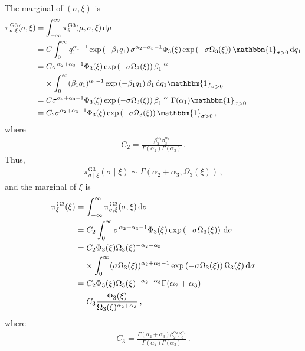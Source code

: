 \documentclass{article}
\newcommand{\dd}{{\rm d}}
\begin{document}
%
The marginal of $(\sigma, \xi)$ is
%
\begin{align}
	\pi ^ {\text{G3}}_{\sigma, \xi}(\sigma, \xi)
		&= \int_{-\infty}^\infty \pi_{\theta}^{\text{G3}}(\mu, \sigma, \xi)
		\, \dd \mu \nonumber\\
	&=C \int_{0}^\infty q_1 ^ {\alpha_1 - 1} \exp\left(-\beta_1 q_1\right)
		\sigma^{\alpha_2 + \alpha_3 - 1} \Phi_3(\xi)
		\exp\left(-\sigma \Omega_3(\xi)\right)\mathbbm{1}_{\sigma > 0}
		\, \dd q_1 \nonumber\\
	&= C \sigma ^ {\alpha_2 + \alpha_3 - 1} \Phi_3(\xi)
		\exp\left(-\sigma \Omega_3(\xi)\right) \beta_1 ^ {-\alpha_1} \nonumber\\
	&\ \phantom{=} \times \int_{0}^\infty (\beta_1 q_1) ^ {\alpha_1 - 1}
		\exp\left(-\beta_1 q_1\right) \beta_1 \, \dd q_1
		\mathbbm{1}_{\sigma > 0} \nonumber\\
	&= C \sigma ^ {\alpha_2 + \alpha_3 - 1} \Phi_3(\xi)
		\exp\left(-\sigma \Omega_3(\xi)\right) \beta_1 ^ {-\alpha_1}
		\Gamma(\alpha_1) \mathbbm{1}_{\sigma > 0} \nonumber\\
	&= C_2 \sigma ^ {\alpha_2 + \alpha_3 - 1} \Phi_3(\xi)
		\exp\left(-\sigma \Omega_3(\xi)\right) \mathbbm{1}_{\sigma > 0} \,,
	\label{eq:prior-1-xi-sigma}
\end{align}
%
where
%
\begin{align*}
	C_2 = \frac{\beta_2 ^ {\alpha_2} \beta_3 ^ {\alpha_3}}
		{\Gamma(\alpha_2) \Gamma(\alpha_3)} \,.
\end{align*}
%
Thus,
%
\begin{align*}
	\pi ^ {\text{G3}}_{\sigma \mid \xi}(\sigma \mid \xi)
		\sim \Gamma(\alpha_2 + \alpha_3, \Omega_3(\xi)) \,,
\end{align*}
%
and the marginal of $\xi$ is
%
\begin{align}
	\pi ^ {\text{G3}}_\xi(\xi)
		&= \int_{-\infty}^\infty \pi^{\text{G3}}_{\sigma, \xi}(\sigma, \xi)
		\, \dd \sigma \nonumber\\
	&=C_2 \int_{0}^\infty \sigma ^ {\alpha_2 + \alpha_3 - 1} \Phi_3(\xi)
		\exp\left(-\sigma \Omega_3(\xi)\right) \, \dd \sigma \nonumber\\
	&=C_2 \Phi_3(\xi) \Omega_3(\xi) ^ {-\alpha_2 - \alpha_3} \nonumber\\
	&\ \phantom{=} \times \int_{0}^\infty (\sigma \Omega_3(\xi))
		^ {\alpha_2 + \alpha_3 - 1} \exp\left(-\sigma \Omega_3(\xi)\right)
		\Omega_3(\xi) \, \dd \sigma \nonumber\\
	&= C_2 \Phi_3(\xi) \Omega_3(\xi) ^ {-\alpha_2 - \alpha_3}
		\Gamma(\alpha_2 + \alpha_3) \nonumber\\
	&=C_3 \frac{\Phi_3(\xi)}{\Omega_3(\xi) ^ {\alpha_2 + \alpha_3}} \,,
	\label{eq:prior-1-xi}
\end{align}
%
where
%
\begin{align*}
	C_3 = \frac{\Gamma(\alpha_2 + \alpha_3) \beta_2 ^ {\alpha_2}
		\beta_3 ^ {\alpha_3}} {\Gamma(\alpha_2) \Gamma(\alpha_3)} \,.
\end{align*}
%
\end{document}
